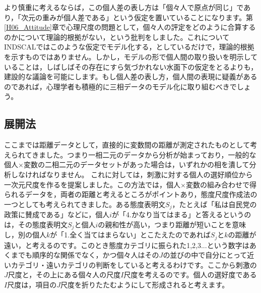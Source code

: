 \documentclass{ltjsbook}
\begin{document}
より慎重に考えるならば，この個人差の表し方は「個々人で原点が同じ」であり，「次元の重みが個人差である」という仮定を置いていることになります。第\ref{H06_Attitude}章で心理尺度の問題として，個々人の評定をどのように合算するのかについて理論的根拠がない，という批判をしました。これについてINDSCALではこのような仮定でモデル化する，としているだけで，理論的根拠を示すものではありません。しかし，モデルの形で個人間の取り扱いを明示していることは，しばしばその存在にすら気づかれない水面下の仮定をとるよりも，建設的な議論を可能にします。もし個人差の表し方，個人間の表現に疑義があるのであれば，心理学者も積極的に三相データのモデル化に取り組むべきでしょう。

\subsection{展開法}
ここまでは距離データとして，直接的に変数間の距離が測定されたものとして考えられてきました。つまり一相二元のデータから分析が始まっており，一般的な個人$\times$変数の二相二元のデータセットがあった場合は，いずれかの相を潰して分析しなければなりません。
これに対して\citet{coombs1950psychological}は，刺激に対する個人の選好順位から一次元尺度を作るを提案しました。この方法では，個人$\times$変数の組み合わせで得られるデータを，両者の距離と考えるところがポイントあり，態度尺度作成法の一つとしても考えられてきました\citep{Fujihara2001}。ある態度表明文$S_j$，たとえば「私は自民党の政策に賛成である」などに，個人$i$が「4.かなり当てはまる」と答えるというのは，その態度表明文$S_j$と個人$i$の親和性が高い，つまり距離が短いことを意味し，別の個人$k$が「1.全く当てはまらない」とこたえたのであれば$S_j$と$k$の距離が遠い，と考えるのです。このとき態度カテゴリに振られた1,2,3...という数字はあくまでも順序的な関係でなく，かつ個々人はその$J$の並びの中で自分にとって近いカテゴリ・遠いカテゴリの判断をしていると考えるわけです。ここから刺激の$J$尺度と，その上にある個々人の尺度$I$尺度を考えるのです。個人の選好度である$I$尺度は，項目の$J$尺度を折りたたむようにして形成されると考えます。
\end{document}

